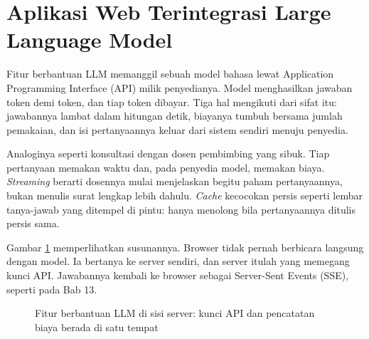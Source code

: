 \section{Aplikasi Web Terintegrasi Large Language Model}

Fitur berbantuan LLM memanggil sebuah model bahasa lewat Application
Programming Interface (API) milik penyedianya. Model menghasilkan jawaban
token demi token, dan tiap token dibayar. Tiga hal mengikuti dari sifat itu:
jawabannya lambat dalam hitungan detik, biayanya tumbuh bersama jumlah
pemakaian, dan isi pertanyaannya keluar dari sistem sendiri menuju
penyedia.

Analoginya seperti konsultasi dengan dosen pembimbing yang sibuk. Tiap
pertanyaan memakan waktu dan, pada penyedia model, memakan biaya.
\textit{Streaming} berarti dosennya mulai menjelaskan begitu paham
pertanyaannya, bukan menulis surat lengkap lebih dahulu. \textit{Cache}
kecocokan persis seperti lembar tanya-jawab yang ditempel di pintu: hanya
menolong bila pertanyaannya ditulis persis sama.

Gambar \ref{fig:llm14} memperlihatkan susunannya. Browser tidak pernah
berbicara langsung dengan model. Ia bertanya ke server sendiri, dan server
itulah yang memegang kunci API. Jawabannya kembali ke browser sebagai
Server-Sent Events (SSE), seperti pada Bab 13.

\begin{figure}[!htb]
  \centering
  \caption{Fitur berbantuan LLM di sisi server: kunci API dan pencatatan
           biaya berada di satu tempat}
  \label{fig:llm14}
\end{figure}

